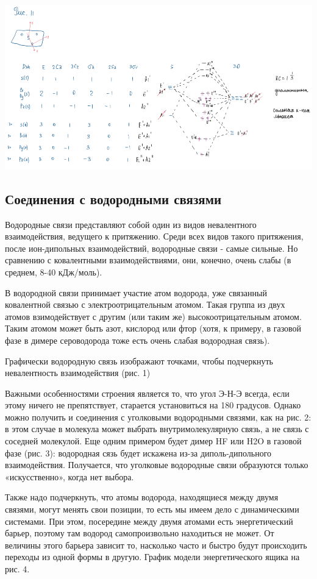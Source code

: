 \documentclass[14pt,a4paper]{scrartcl}
\begin{document}
\includegraphics{16v4.png}

\subsection{Соединения с водородными связями}

Водородные связи представляют собой один из видов невалентного взаимодействия, ведущего к притяжению. Среди всех видов такого притяжения, после ион-дипольных
взаимодействий, водородные связи - самые сильные. Но сравнению с ковалентными взаимодействиями, они, конечно, очень слабы (в среднем, 8-40 кДж/моль).

В водородной связи принимает участие атом водорода, уже связанный ковалентной связью с электроотрицательным атомом. Такая группа из двух атомов взимодействует с другим (или
таким же) высокоотрицательным атомом. Таким атомом может быть азот, кислород или фтор (хотя, к примеру, в газовой фазе в димере сероводорода тоже есть очень слабая водородная
связь).

Графически водородную связь изображают точками, чтобы подчеркнуть невалентность взаимодействия (рис. 1)

Важными особенностями строения является то, что угол Э-Н-Э всегда, если этому ничего не препятствует, старается установиться на 180 градусов. Однако можно получить и соединения
с уголковыми водородными связями, как на рис. 2: в этом случае в молекула может выбрать внутримолекулярную связь, а не связь с соседней молекулой. Еще одним примером будет
димер HF или H2O в газовой фазе (рис. 3): водородная сязь будет искажена из-за диполь-дипольного взаимодействия. Получается, что уголковые водородные связи образуются только
«искусственно», когда нет выбора. 

Также надо подчеркнуть, что атомы водорода, находящиеся между двумя связями, могут менять свои позиции, то есть мы имеем дело с динамическими системами. При этом,
посередине между двумя атомами есть энергетический барьер, поэтому там водород самопроизвольно находиться не может. От величины этого барьера зависит то, насколько часто и
быстро будут происходить переходы из одной формы в другую. График модели энергетического ящика на рис. 4. 
\end{document}
